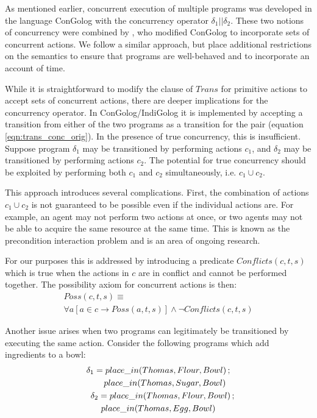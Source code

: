 \documentclass[letterpaper]{article}
\begin{document}
As mentioned earlier, concurrent execution of multiple programs
was developed in the language ConGolog with the concurrency operator
$\delta_1||\delta_2$.
These two notions of concurrency were combined by
\cite{pinto99tcongolog}, who modified ConGolog to incorporate sets
of concurrent actions. We follow a similar approach, but place
additional restrictions on the semantics to ensure that programs are
well-behaved and to incorporate an account of time.

While it is straightforward to modify the clause of $Trans$
for primitive actions to accept sets of concurrent actions, there are
deeper implications for the concurrency operator. In ConGolog/IndiGolog it
is implemented by accepting a transition from either of the two programs
as a transition for the pair (equation \ref{eqn:trans_conc_orig}).
In the presence of true concurrency, this is insufficient. Suppose program
$\delta_1$ may be transitioned by performing actions $c_1$, and
$\delta_2$ may be transitioned by performing actions $c_2$.
The potential for true concurrency should be exploited by performing both $c_1$
and $c_2$ simultaneously, i.e. $c_1 \cup c_2$.

This approach introduces several complications. First, the combination
of actions $c_{1}\cup c_{2}$ is not guaranteed to be possible even if the
individual actions are.  For example, an agent may not perform two actions
at once, or two agents may not be able to acquire the same resource at the
same time.
This is known as the precondition interaction problem \cite{pinto94temporal}
and is an area of ongoing research.

For our purposes this is addressed by introducing a predicate $Conflicts(c,t,s)$
which is true when the actions in $c$ are in conflict and cannot
be performed together. The possibility axiom for concurrent actions
is then:
\begin{multline}
\label{eqn:poss_conc_acts}
Poss(c,t,s)\equiv\\
\forall a\left[a\in c\rightarrow Poss(a,t,s)\right]\wedge\neg Conflicts(c,t,s)
\end{multline}

Another issue arises when two programs can legitimately be transitioned
by executing the same action. Consider the following programs which
add ingredients to a bowl:
\begin{multline}
\delta_{1}=place\_ in(Thomas,Flour,Bowl)\,;\\
   \shoveright{place\_ in(Thomas,Sugar,Bowl)}\\
\shoveleft{\delta_{2}=place\_ in(Thomas,Flour,Bowl)\,;}\\
   place\_ in(Thomas,Egg,Bowl)
\end{multline}
\end{document}
